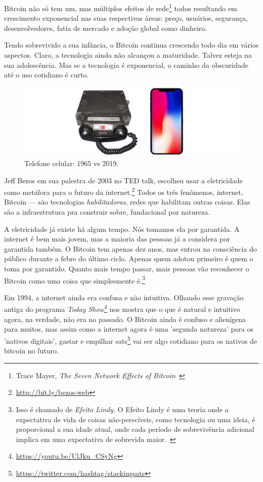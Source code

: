Bitcoin não só tem um, mas múltiplos efeitos de rede\footnote{Trace Mayer,
\textit{The Seven Network Effects of Bitcoin}~\cite{7-network-effects}} todos resultando em crescimento exponencial nas suas respectivas áreas: preço, usuários, segurança, desenvolvedores, fatia de mercado e adoção global como dinheiro.

Tendo sobrevivido a sua infância, o Bitcoin continua crescendo todo dia em vários aspectos.
Claro, a tecnologia ainda não alcançou a maturidade. Talvez esteja na sua adolescência. Mas se a tecnologia é exponencial, o caminho da obscuridade até o uso cotidiano é curto. 

\begin{figure}
  \includegraphics{assets/images/mobile-phone.png}
  \caption{Telefone celular: 1965 vs 2019.}
  \label{fig:mobile-phone}
\end{figure}

Jeff Bezos em sua palestra de 2003 no TED talk, escolheu usar a eletricidade 
como metáfora para o futuro da internet.\footnote{\url{http://bit.ly/bezos-web}} 
Todos os três fenômenos, internet, Bitcoin --- são tecnologias \textit{habilitadoras}, 
redes que habilitam outras coisas. Elas são a infraestrutura pra construir sobre, fundacional por natureza.

A eletricidade já existe há algum tempo. Nós tomamos ela por garantida. A internet é bem mais jovem, mas a maioria das pessoas já a considera por garantida também. O Bitcoin tem apenas dez anos, mas entrou na consciência do público durante a febre do último ciclo. Apenas quem adotou primeiro é quem o toma por garantido. Quanto mais tempo passar, mais pessoas vão reconhecer o Bitcoin como uma coisa que simplesmente é.\footnote{Isso é chamado de  \textit{Efeito Lindy}. O Efeito Lindy é uma teoria onde a expectativa de vida de coisas não-perecíveis, como tecnologia ou uma ideia, é proporcional a sua idade atual, onde cada período de sobrevivência adicional implica em uma expectativa de sobrevida maior.~\cite{wiki:lindy}}

Em 1994, a internet ainda era confusa e não intuitiva. Olhando esse gravação antiga do programa  \textit{Today Show}\footnote{\url{https://youtu.be/UlJku_CSyNg}} nos mostra que o que é natural e intuitivo agora, na verdade, não era no passado. O Bitcoin ainda é confuso e alienígena para muitos, mas assim como a internet agora é uma 'segunda natureza' para os 'nativos digitais', gastar e empilhar sats\footnote{\url{https://twitter.com/hashtag/stackingsats}} vai ser algo cotidiano para os nativos de bitcoin no futuro.

